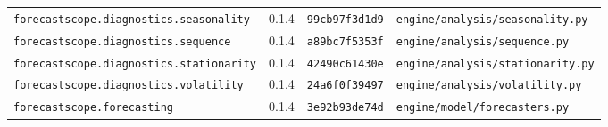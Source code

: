 \begin{longtable}{p{}p{}p{}p{}}
\texttt{forecastscope.\allowbreak{}diagnostics.\allowbreak{}seasonality} & 0.1.4 & \texttt{99cb97f3d1d9} & \texttt{engine/\allowbreak{}analysis/\allowbreak{}seasonality.\allowbreak{}py}\\
\texttt{forecastscope.\allowbreak{}diagnostics.\allowbreak{}sequence} & 0.1.4 & \texttt{a89bc7f5353f} & \texttt{engine/\allowbreak{}analysis/\allowbreak{}sequence.\allowbreak{}py}\\
\texttt{forecastscope.\allowbreak{}diagnostics.\allowbreak{}stationarity} & 0.1.4 & \texttt{42490c61430e} & \texttt{engine/\allowbreak{}analysis/\allowbreak{}stationarity.\allowbreak{}py}\\
\texttt{forecastscope.\allowbreak{}diagnostics.\allowbreak{}volatility} & 0.1.4 & \texttt{24a6f0f39497} & \texttt{engine/\allowbreak{}analysis/\allowbreak{}volatility.\allowbreak{}py}\\
\texttt{forecastscope.\allowbreak{}forecasting} & 0.1.4 & \texttt{3e92b93de74d} & \texttt{engine/\allowbreak{}model/\allowbreak{}forecasters.\allowbreak{}py}\\
\bottomrule
\end{longtable}
